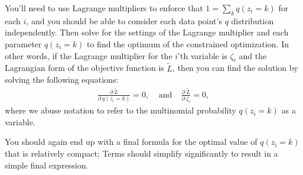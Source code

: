 \documentclass[10pt]{article}
\begin{document}
\begin{enumerate}
\begin{enumerate}
You'll need to use Lagrange multipliers to enforce that $1 = \sum_k q(z_i = k)$ for each $i$, and you should be able to consider each data point's $q$ distribution independently.
Then solve for the settings of the Lagrange multiplier and each parameter $q(z_i = k)$ to find the optimum of the constrained optimization. In other words, if the Lagrange multiplier for the $i$'th variable is $\zeta_i$ and the Lagrangian form of the objective function is $\tilde{L}$, then you can find the solution by solving the following equations:
\begin{equation}
\begin{aligned}
\frac{\partial ~ \tilde{L}}{\partial ~ q(z_i = k)} = 0, ~~~~~\textrm{and}~~~~~ \frac{\partial ~ \tilde{L}}{\partial ~ \zeta_i} = 0,
\end{aligned}
\end{equation}
where we abuse notation to refer to the multinomial probability $q(z_i = k)$ as a variable.

You should again end up with a final formula for the optimal value of $q(z_i = k)$ that is relatively compact; Terms should simplify significantly to result in a simple final expression. 



\end{enumerate}
\end{enumerate}
\end{document}
